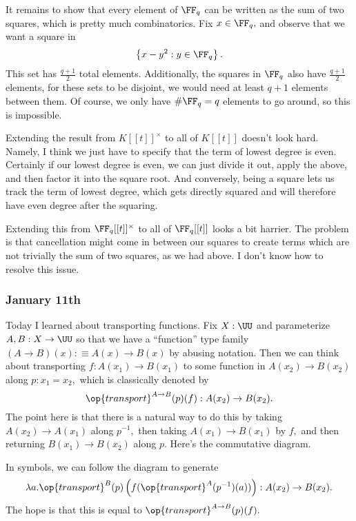 It remains to show that every element of $\FF_q$ can be written as the sum of two squares, which is pretty much combinatorics. Fix $x\in\FF_q,$ and observe that we want a square in
\[\left\{x-y^2:y\in\FF_q\right\}.\]
This set has $\frac{q+1}2$ total elements. Additionally, the squares in $\FF_q$ also have $\frac{q+1}2$ elements, for these sets to be disjoint, we would need at least $q+1$ elements between them. Of course, we only have $\#\FF_q=q$ elements to go around, so this is impossible.

Extending the result from $K[[t]]^\times$ to all of $K[[t]]$ doesn't look hard. Namely, I think we just have to specify that the term of lowest degree is even. Certainly if our lowest degree is even, we can just divide it out, apply the above, and then factor it into the square root. And conversely, being a square lets us track the term of lowest degree, which gets directly squared and will therefore have even degree after the squaring.

Extending this from $\FF_q[[t]]^\times$ to all of $\FF_q[[t]]$ looks a bit harrier. The problem is that cancellation might come in between our squares to create terms which are not trivially the sum of two squares, as we had above. I don't know how to resolve this issue.

\subsubsection{January 11th}
Today I learned about transporting functions. Fix $X:\UU$ and parameterize $A,B:X\to\UU$ so that we have a ``function'' type family $(A\to B)(x):\equiv A(x)\to B(x)$ by abusing notation. Then we can think about transporting $f:A(x_1)\to B(x_1)$ to some function in $A(x_2)\to B(x_2)$ along $p:x_1=x_2,$ which is classically denoted by
\[\op{transport}^{A\to B}(p)(f):A(x_2)\to B(x_2).\]
The point here is that there is a natural way to do this by taking $A(x_2)\to A(x_1)$ along $p^{-1},$ then taking $A(x_1)\to B(x_1)$ by $f,$ and then returning $B(x_1)\to B(x_2)$ along $p.$ Here's the commutative diagram.
\begin{center}
\end{center}
In symbols, we can follow the diagram to generate
\[\lambda a.\op{transport}^B(p)\left(f(\op{transport}^A(p^{-1})(a))\right):A(x_2)\to B(x_2).\]
The hope is that this is equal to $\op{transport}^{A\to B}(p)(f).$

